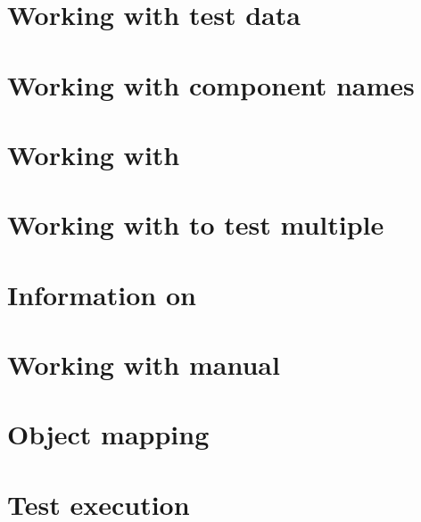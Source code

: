 \clearpage

\section{Working with test data}
\label{WorkingWithData}


\clearpage

\section{Working with component names}
\label{reass}



\clearpage

\section{Working with \gdsuites{}}
\label{WorkingWithSuites}


\clearpage 

\section{Working with \gdjobs{} to test multiple \gdauts{}}
\label{WorkingWithJobs}


\clearpage 

\section{Information on \gdsteps{}}


\section{Working with manual \gdcases{}}


\clearpage

\section{Object mapping}


\clearpage

\section{Test execution}
\label{TestExec}


